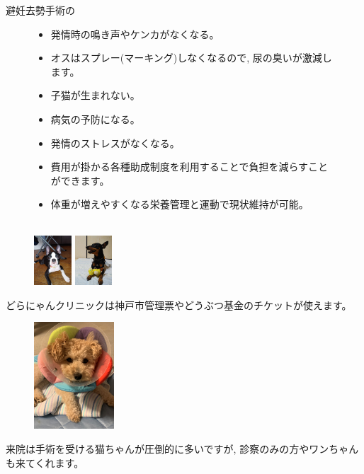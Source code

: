 \documentclass{jsarticle}
\begin{document}
\newpage


\Large

	避妊去勢手術の

	\begin{figure}[htbp]
		\Large
		\centering
		\begin{minipage}{0.4\columnwidth}
			\huge
			\Large
			\begin{itemize}
				\item 発情時の鳴き声やケンカがなくなる。
				\item オスはスプレー(マーキング)しなくなるので, 尿の臭いが激減します。
				\item 子猫が生まれない。
				\item 病気の予防になる。
				\item 発情のストレスがなくなる。
			\end{itemize}
		\end{minipage}
		\hspace{10pt}
		\begin{minipage}{0.4\columnwidth}
			\huge
			\Large
			\begin{itemize}
				\item 費用が掛かる各種助成制度を利用することで負担を減らすことができます。
				\item 体重が増えやすくなる栄養管理と運動で現状維持が可能。 \\\\
			\end{itemize}
		\end{minipage}
	\end{figure}

	\begin{figure}
		\includegraphics[width=1.4cm]{6.jpg}
		\includegraphics[width=1.4cm]{7.jpg}
	\end{figure}
	どらにゃんクリニックは神戸市管理票やどうぶつ基金のチケットが使えます。

	\vspace{30pt}
	\begin{figure}
		\vspace*{-\intextsep}
		\includegraphics[width=3cm]{5.jpg}
	\end{figure}
	来院は手術を受ける猫ちゃんが圧倒的に多いですが, 診察のみの方やワンちゃんも来てくれます。
\end{document}

